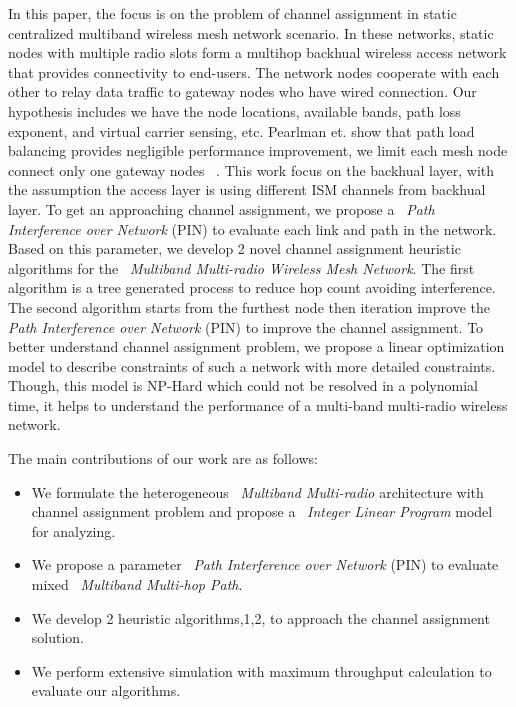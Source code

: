 In this paper, the focus is on the problem of channel assignment in static centralized multiband wireless mesh network scenario. 
In these networks, static nodes with multiple radio slots form a multihop backhual wireless access network that provides connectivity to end-users. The network nodes cooperate with each other to relay data traffic to gateway nodes who have wired connection. 
Our hypothesis includes we have the node locations, available bands, path loss exponent, and virtual carrier sensing, etc. 
Pearlman et. show that path load balancing provides negligible performance improvement, we limit each mesh node connect only one gateway nodes ~\cite{pearlman2000impact}.
This work focus on the backhual layer, with the assumption the access layer is using different ISM channels from backhual layer.
To get an approaching channel assignment, we propose a ~\emph{Path Interference over Network} (PIN) to evaluate each link and path in the network. Based on this parameter, we develop 2 novel channel assignment heuristic algorithms for the ~\emph{Multiband Multi-radio Wireless Mesh Network}. 
The first algorithm is a tree generated process to reduce hop count avoiding interference. The second algorithm starts from the furthest node then iteration improve the \emph{Path Interference over Network} (PIN) to improve the channel assignment.
To better understand channel assignment problem, we propose a linear optimization model to describe constraints of such a network with more detailed constraints. Though, this model is NP-Hard which could not be resolved in a polynomial time, it helps to understand the performance of a multi-band multi-radio wireless network. 

% 
The main contributions of our work are as follows:
\begin{itemize}
\item We formulate the heterogeneous ~\emph{Multiband Multi-radio} architecture with channel assignment problem and propose a ~\emph{Integer Linear Program} model for analyzing.  

\item We propose a  parameter ~\emph{Path Interference over Network} (PIN) to evaluate mixed ~\emph{Multiband Multi-hop Path}.

\item We develop 2 heuristic algorithms,1,2, to approach the channel assignment solution.

\item We perform extensive simulation with maximum throughput calculation to evaluate our algorithms.


\end{itemize}

